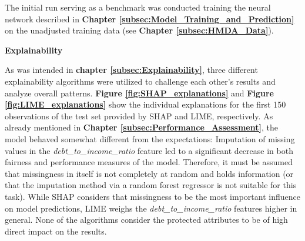 The initial run serving as a benchmark was conducted training the neural network described in \textbf{Chapter \ref{subsec:Model_Training_and_Prediction}} on the unadjusted training data (see \textbf{Chapter \ref{subsec:HMDA_Data}}).

\textbf{Explainability}

As was intended in \textbf{chapter \ref{subsec:Explainability}}, three different explainability algorithms were utilized to challenge each other's results and analyze overall patterns. \textbf{Figure \ref{fig:SHAP_explanations}} and \textbf{Figure \ref{fig:LIME_explanations}} show the individual explanations for the first 150 observations of the test set provided by SHAP and LIME, respectively. 
As already mentioned in \textbf{Chapter \ref{subsec:Performance_Assessment}}, the model behaved somewhat different from the expectations: Imputation of missing values in the \textit{debt\_to\_income\_ratio} feature led to a significant decrease in both fairness and performance measures of the model.
Therefore, it must be assumed that missingness in itself is not completely at random and holds information (or that the imputation method via a random forest regressor is not suitable for this task).
While SHAP considers that missingness to be the most important influence on model predictions, LIME weighs the \textit{debt\_to\_income\_ratio} features higher in general.
None of the algorithms consider the protected attributes to be of high direct impact on the results.

